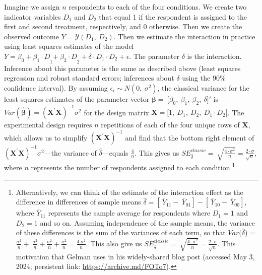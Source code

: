 \documentclass[12pt]{article}
\begin{document}
Imagine we assign $n$ respondents to each of the four conditions. 
We create two indicator variables $D_{1}$ and $D_{2}$ that equal 1 if the respondent is assigned to the first and second treatment, respectively, and 0 otherwise. 
Then we create the observed outcome $Y = \mathcal{Y}\left( D_{1},\ D_{2} \right)$. 
Then we estimate the interaction in practice using least squares estimates of the model
$Y = \beta_{0} + {\beta_{1} \cdot D}_{1}{{+ \ \beta}_{2} \cdot D}_{2} + \delta \cdot D_{1} \cdot D_{2} + \epsilon$.
The parameter $\delta$ is the interaction. 
Inference about this parameter is the same as described above (least squares regression and robust standard errors; inferences about $\delta$ using the 90\% confidence interval). 
By assuming $\epsilon_{i} \sim N\left( 0,\ \sigma^{2} \right)$, the classical variance for the least squares estimates of the parameter vector $\mathbf{\beta} = \ \lbrack\beta_{0},\ \beta_{1},\ \beta_{2},\ \delta\rbrack'$ is $Var\left( \widehat{\mathbf{\beta}} \right) = \left( \mathbf{X}^{'}\mathbf{X} \right)^{- 1}\sigma^{2}$ for the design matrix $\mathbf{X} = \lbrack 1,\ D_{1},\ D_{2},\ D_{1} \cdot D_{2}\rbrack$. 
The experimental design requires $n$ repetitions of each of the four unique rows of $\mathbf{X}$, which allows us to simplify $\left( \mathbf{X}^{'}\mathbf{X} \right)^{- 1}$ and find that the bottom right element of $\left( \mathbf{X}^{'}\mathbf{X} \right)^{- 1}\sigma^{2}$---the variance of $\widehat{\delta}$---equals $\frac{4}{n}$. 
This gives us $SE_{\widehat{\delta}}^{classic} = \ \sqrt{\frac{{4 \cdot \sigma}^{2}}{n}} = \frac{2 \cdot \sigma}{\sqrt{n}}$, where $n$ represents the number of respondents assigned to each condition.\footnote{Alternatively, we can think of the estimate of the
  interaction effect as the difference in differences of sample means
  $\widehat{\delta} = \left\lbrack \ {\overline{Y}}_{11}-\ {\overline{Y}}_{01} \right\rbrack - \left\lbrack \ {\overline{Y}}_{10}-\ {\overline{Y}}_{00} \right\rbrack$,
  where ${\overline{Y}}_{11}$ represents the sample average for respondents
  where $D_{1} = 1$ and $D_{2} = 1$ and so on. Assuming
  independence of the sample means, the variance of these differences is
  the sum of the variances of each term, so that
  $Var(\widehat{\delta}$) =
  $\frac{\sigma^{2}}{n} + \ \frac{\sigma^{2}}{n} + \frac{\sigma^{2}}{n} + \frac{\sigma^{2}}{n} = \frac{4{\cdot \sigma}^{2}}{n}$.
  This also give us
  $SE_{\widehat{\delta}}^{classic} = \ \sqrt{\frac{{4 \cdot \sigma}^{2}}{n}} = \frac{2 \cdot \sigma}{\sqrt{n}}$.
  This motivation that Gelman uses in his widely-shared blog post
  (accessed May 3, 2024; persistent link:
  \url{https://archive.md/FOTo7}).} 
\end{document}
